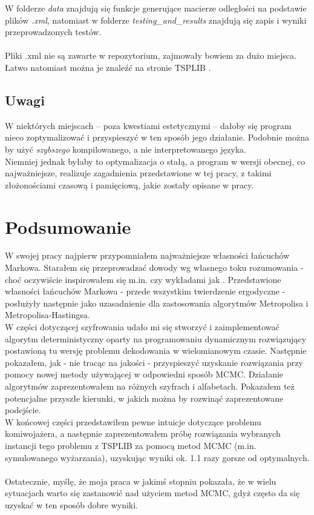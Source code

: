 \documentclass[a4paper]{article}
\theoremstyle{defn}
\theoremstyle{theorem}
\theoremstyle{lemma}
\theoremstyle{cor}
\theoremstyle{fact}
\begin{document}
W folderze \textit{data} znajdują się funkcje generujące macierze odległości na podstawie plików \textit{.xml}, natomiast w folderze \textit{testing\_and\_results} znajdują się zapis i wyniki przeprowadzonych testów. \\\\
Pliki .xml nie są zawarte w repozytorium, zajmowały bowiem za dużo miejsca. Łatwo natomiast można je znaleźć na stronie TSPLIB \cite{benchmark}.
\subsection{Uwagi}
W niektórych miejscach – poza kwestiami estetycznymi – dałoby się program nieco zoptymalizować i przyspieszyć w ten sposób jego działanie. Podobnie można by użyć \textit{szybszego} kompilowanego, a nie interpretowanego języka.\\
Niemniej jednak byłaby to optymalizacja o stałą, a program w wersji obecnej, co najważniejsze, realizuje zagadnienia przedstawione w tej pracy, z takimi złożonościami czasową i pamięciową, jakie zostały opisane w pracy.
\newpage
\section{Podsumowanie}
W swojej pracy najpierw przypomniałem najważniejsze własności łańcuchów Markowa. Starałem się przeprowadzać dowody wg własnego toku rozumowania - choć oczywiście inspirowałem się m.in. \cite{sztencel} czy wykładami jak \cite{coupling}.
Przedstawione własności łańcuchów Markowa - przede wszystkim twierdzenie ergodyczne - posłużyły następnie jako uzasadnienie dla zastosowania algorytmów Metropolisa i Metropolisa-Hastingsa.
\\
W części dotyczącej szyfrowania udało mi się stworzyć i zaimplementować algorytm deterministyczny oparty na programowaniu dynamicznym rozwiązujący postawioną tu wersję problemu dekodowania w wielomianowym czasie. Następnie pokazałem, jak - nie tracąc na jakości - przyspieszyć uzyskanie rozwiązania przy pomocy nowej metody używającej w odpowiedni sposób MCMC. Działanie algorytmów zaprezentowałem na różnych szyfrach i alfabetach. Pokazałem też potencjalne przyszłe kierunki, w jakich można by rozwinąć zaprezentowane podejście. \\
W końcowej części przedstawiłem pewne intuicje dotyczące problemu komiwojażera, a następnie zaprezentowałem próbę rozwiązania wybranych instancji tego problemu z TSPLIB za pomocą metod MCMC (m.in. symulowanego wyżarzania), uzyskując wyniki ok. 1.1 razy gorsze od optymalnych.\\\\
Ostatecznie, myślę, że moja praca w jakimś stopniu pokazała, że w wielu sytuacjach warto się zastanowić nad użyciem metod MCMC, gdyż często da się uzyskać w ten sposób dobre wyniki.
\end{document}
